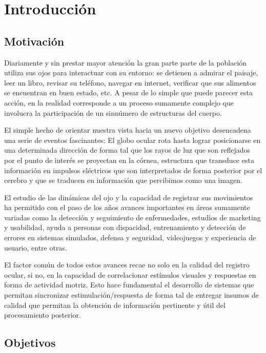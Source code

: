 \documentclass[../main.tex]{subfiles}
\begin{document}
		
\chapter{Introducción}
\label{cha:01_introducción}
	\section{Motivación}
	\label{sec:01_motivacion}

		Diariamente y sin prestar mayor atención la gran parte parte de la población utiliza sus ojos para interactuar con su entorno: se detienen a admirar el paisaje, leer un libro, revisar su teléfono, navegar en internet, verificar que sus alimentos se encuentran en buen estado, etc. A pesar de lo simple que puede parecer esta acción, en la realidad corresponde a un proceso sumamente complejo que involucra la participación de un sinnúmero de estructuras del cuerpo. 

		El simple hecho de orientar nuestra vista hacia un nuevo objetivo desencadena una serie de eventos fascinantes: El globo ocular rota hasta lograr posicionarse en una determinada dirección de forma tal que los rayos de luz que son reflejados por el punto de interés se proyectan en la córnea, estructura que transduce esta información en impulsos eléctricos que son interpretados de forma posterior por el cerebro y que se traducen en información que percibimos como una imagen. 

		El estudio de las dinámicas del ojo y la capacidad de registrar sus movimientos ha permitido con el paso de los años avances importantes en áreas sumamente variadas como la detección y seguimiento de enfermedades, estudios de marketing y usabilidad, ayuda a personas con dispacidad, entrenamiento y detección de errores en sistemas simulados, defensa y seguridad, videojuegos y experiencia de usuario, entre otras.

		El factor común de todos estos avances recae no solo en la calidad del registro ocular, si no, en la capacidad de correlacionar estímulos visuales y respuestas en forma de actividad motriz. Esto hace fundamental el desarrollo de sistemas que permitan sincronizar estimulación/respuesta de forma tal de entregar insumos de calidad que permitan la obtención de información pertinente y útil del procesamiento posterior.  

	\section{Objetivos}
	\label{sec:01_objetivos}
\end{document}
